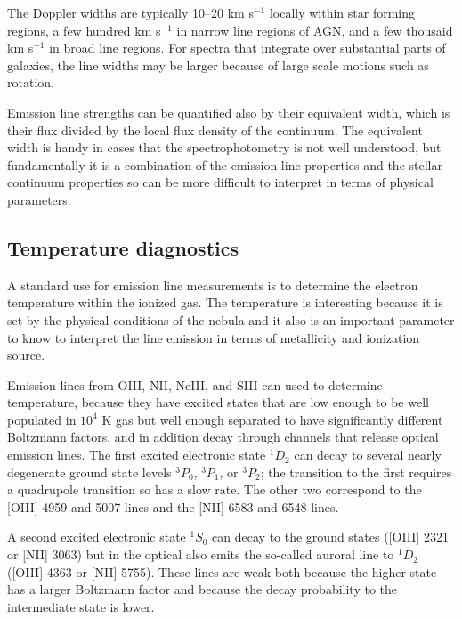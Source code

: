 The Doppler widths are typically 10--20 km s$^{-1}$ locally within
star forming regions, a few hundred km s$^{-1}$ in narrow line regions
of AGN, and a few thousaid km s$^{-1}$ in broad line regions. For
spectra that integrate over substantial parts of galaxies, the line
widths may be larger because of large scale motions such as rotation.

Emission line strengths can be quantified also by their equivalent
width, which is their flux divided by the local flux density of the
continuum. The equivalent width is handy in cases that the
spectrophotometry is not well understood, but fundamentally it is a
combination of the emission line properties and the stellar continuum
properties so can be more difficult to interpret in terms of physical
parameters.

\subsection{Temperature diagnostics}

A standard use for emission line measurements is to determine the
electron temperature within the ionized gas. The temperature is
interesting because it is set by the physical conditions of the nebula
and it also is an important parameter to know to interpret the line
emission in terms of metallicity and ionization source.

Emission lines from OIII, NII, NeIII, and SIII can used to determine
temperature, because they have excited states that are low enough to
be well populated in $10^4$ K gas but well enough separated to have
significantly different Boltzmann factors, and in addition decay
through channels that release optical emission lines. The first
excited electronic state ${}^{1}D_2$ can decay to several nearly
degenerate ground state levels ${}^3P_0$, ${}^3P_1$, or ${}^3P_2$; the
transition to the first requires a quadrupole transition so has a slow
rate. The other two correspond to the [OIII] 4959 and 5007 lines and
the [NII] 6583 and 6548 lines.

A second excited electronic state ${}^1S_0$ can decay to the ground
states ([OIII] 2321 or [NII] 3063) but in the optical also emits the
so-called auroral line to ${}^1D_2$ ([OIII] 4363 or [NII] 5755). These
lines are weak both because the higher state has a larger Boltzmann
factor and because the decay probability to the intermediate state is
lower. 

